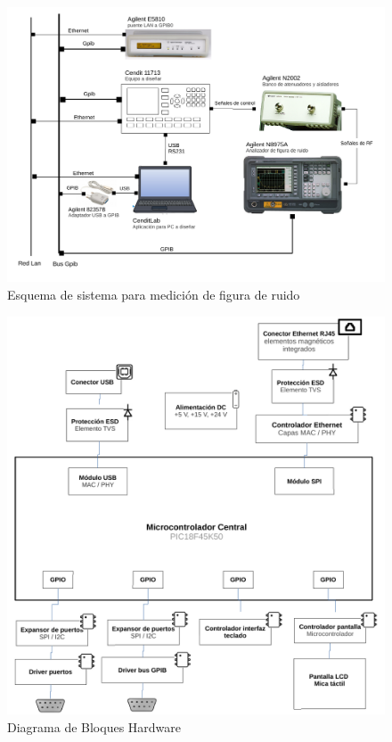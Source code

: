\documentclass[paper=letter,oneside,fontsize=12pt, parskip=full]{article}
\begin{document}
	\begin{figure}[!h]
		\begin{center}
			\includegraphics[width=17cm]{Imagenes/DiagramaBloquesSistema.pdf}
			\caption{Esquema de sistema para medición de figura de ruido}
			\label{Fig:SistemaMediciónFiguraRuido}
		\end{center}
	\end{figure}			
	

	\begin{figure}[!h]
		\begin{center}
			\includegraphics[width=18cm]{Imagenes/DiagramaBloquesHardware2.pdf}
			\caption{Diagrama de Bloques Hardware}
			\label{Fig:Diagrama de Bloques de Hardware}
		\end{center}
	\end{figure}
\end{document}
